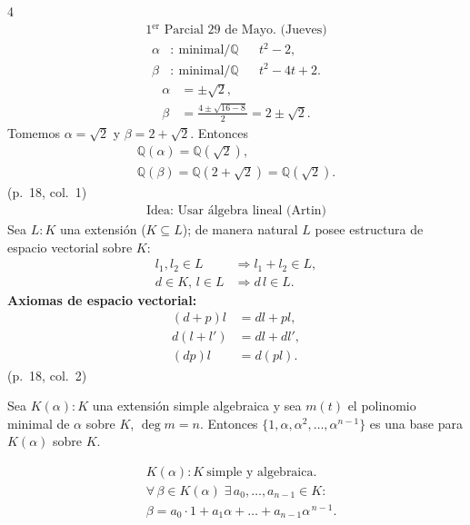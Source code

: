 \documentclass[landscape,a4paper]{article}
\begin{document}
\begin{multicols}{4}
\begin{align*}
\text{1$^{\text{er}}$ Parcial } 29\text{ de Mayo. (Jueves)}
\end{align*}
\begin{align*}
\alpha &:\ \text{minimal}/\mathbb{Q} && t^{2}-2,\\
\beta  &:\ \text{minimal}/\mathbb{Q} && t^{2}-4t+2.
\end{align*}
\begin{align*}
\alpha &= \pm \sqrt{2},\\
\beta  &= \frac{4\pm\sqrt{16-8}}{2}=2\pm\sqrt{2}.
\end{align*}
Tomemos \(\alpha=\sqrt{2}\) y \(\beta = 2+\sqrt{2}\). Entonces
\begin{align*}
\mathbb{Q}(\alpha)=\mathbb{Q}(\sqrt{2}),\qquad\\
\mathbb{Q}(\beta)=\mathbb{Q}(2+\sqrt{2})=\mathbb{Q}(\sqrt{2}).
\end{align*}
(p.~18, col.~1)
\begin{align*}
\text{Idea: Usar álgebra lineal (Artin)}
\end{align*}
Sea $L:K$ una extensión ($K\subseteq L$); de manera natural $L$ posee estructura de espacio vectorial sobre $K$:
\begin{align*}
  l_1,l_2\in L &\Longrightarrow l_1+l_2\in L,\\
  d\in K,\, l\in L &\Longrightarrow d\,l\in L.
\end{align*}
\textbf{Axiomas de espacio vectorial:}
\begin{align*}
  (d+p)l &= d l + p l,\\
  d(l+l') &= d l + d l',\\
  (d p)l &= d( p l ).
\end{align*}
(p.~18, col.~2)
\begin{tcolorbox}[colback=white,colframe=red!80!black,colbacktitle=red!80!black,coltitle=white,title={Lema (p.~18, col.~3)}]
Sea $K(\alpha):K$ una extensión simple algebraica y sea $m(t)$ el polinomio minimal de $\alpha$ sobre $K$, $\deg m=n$. Entonces $\{1,\alpha,\alpha^{2},\dots,\alpha^{n-1}\}$ es una base para $K(\alpha)$ sobre $K$.
\end{tcolorbox}
\begin{align*}
&K(\alpha):K\ \text{simple y algebraica.}\\
&\forall\,\beta\in K(\alpha)\;\exists\,a_0,\dots,a_{n-1}\in K:\ \\
&\beta = a_0\cdot1+a_1\alpha+\dots+a_{n-1}\alpha^{\,n-1}.

\end{align*}
\end{multicols}
\end{document}
